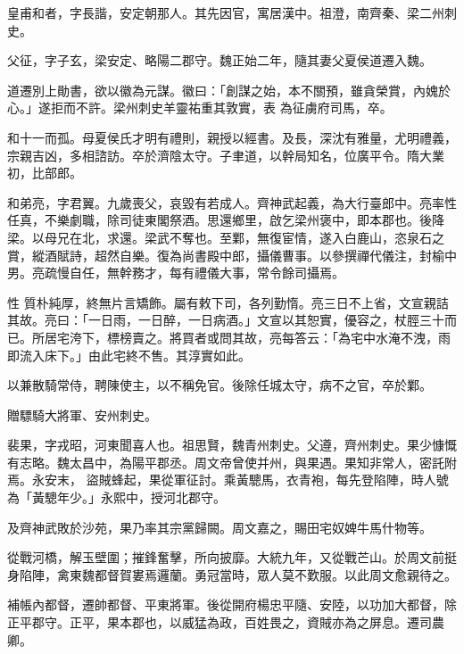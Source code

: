 \begin{pinyinscope}
 皇甫和者，字長諧，安定朝那人。其先因官，寓居漢中。祖澄，南齊秦、梁二州刺史。



 父征，字子玄，梁安定、略陽二郡守。魏正始二年，隨其妻父夏侯道遷入魏。



 道遷別上勛書，欲以徽為元謀。徽曰：「創謀之始，本不關預，雖貪榮賞，內媿於心。」遂拒而不許。梁州刺史羊靈祐重其敦實，表
 為征虜府司馬，卒。



 和十一而孤。母夏侯氏才明有禮則，親授以經書。及長，深沈有雅量，尤明禮義，宗親吉凶，多相諮訪。卒於濟陰太守。子聿道，以幹局知名，位廣平令。隋大業初，比部郎。



 和弟亮，字君翼。九歲喪父，哀毀有若成人。齊神武起義，為大行臺郎中。亮率性任真，不樂劇職，除司徒東閣祭酒。思還鄉里，啟乞梁州褒中，即本郡也。後降梁。以母兄在北，求還。梁武不奪也。至鄴，無復宦情，遂入白鹿山，恣泉石之賞，縱酒賦詩，超然自樂。復為尚書殿中郎，攝儀曹事。以參撰禪代儀注，封榆中男。亮疏慢自任，無幹務才，每有禮儀大事，常令餘司攝焉。



 性
 質朴純厚，終無片言矯飾。屬有敕下司，各列勤惰。亮三日不上省，文宣親詰其故。亮曰：「一日雨，一日醉，一日病酒。」文宣以其恕實，優容之，杖脛三十而已。所居宅洿下，標榜賣之。將買者或問其故，亮每答云：「為宅中水淹不洩，雨即流入床下。」由此宅終不售。其淳實如此。



 以兼散騎常侍，聘陳使主，以不稱免官。後除任城太守，病不之官，卒於鄴。



 贈驃騎大將軍、安州刺史。



 裴果，字戎昭，河東聞喜人也。祖思賢，魏青州刺史。父遵，齊州刺史。果少慷慨有志略。魏太昌中，為陽平郡丞。周文帝曾使并州，與果遇。果知非常人，密託附焉。永安末，
 盜賊蜂起，果從軍征討。乘黃驄馬，衣青袍，每先登陷陣，時人號為「黃驄年少。」永熙中，授河北郡守。



 及齊神武敗於沙苑，果乃率其宗黨歸闕。周文嘉之，賜田宅奴婢牛馬什物等。



 從戰河橋，解玉壁圍；摧鋒奮擊，所向披靡。大統九年，又從戰芒山。於周文前挺身陷陣，禽東魏都督賀婁焉邏蘭。勇冠當時，眾人莫不歎服。以此周文愈親待之。



 補帳內都督，遷帥都督、平東將軍。後從開府楊忠平隨、安陸，以功加大都督，除正平郡守。正平，果本郡也，以威猛為政，百姓畏之，資賊亦為之屏息。遷司農卿。




\end{pinyinscope}
